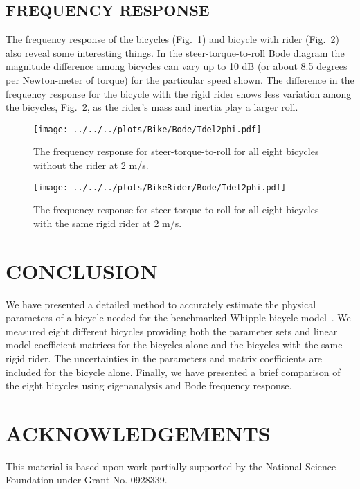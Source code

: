 \documentclass{bmd2010p}
\begin{document}
\subsection{FREQUENCY RESPONSE}
The frequency response of the bicycles (Fig.~\ref{fig:bikeBode}) and bicycle
with rider (Fig.~\ref{fig:bikeRiderBode}) also reveal some
interesting things. In the steer-torque-to-roll Bode diagram the magnitude
difference among bicycles can vary up to 10 dB (or about 8.5 degrees per Newton-meter of
torque) for the particular speed shown. The difference in the frequency response for the bicycle with the
rigid rider shows less variation among the bicycles,
Fig.~\ref{fig:bikeRiderBode}, as the rider's mass and inertia play a larger roll.
\begin{figure}[tbp]
    \centering
    \texttt{[image: ../../../plots/Bike/Bode/Tdel2phi.pdf]}
    \caption{The frequency response for steer-torque-to-roll for all eight
    bicycles without the rider at 2 m/s.}
    \label{fig:bikeBode}
\end{figure}
\begin{figure}[tbp]
    \centering
    \texttt{[image: ../../../plots/BikeRider/Bode/Tdel2phi.pdf]}
    \caption{The frequency response for steer-torque-to-roll for all eight
    bicycles with the same rigid rider at 2 m/s.}
    \label{fig:bikeRiderBode}
\end{figure}
\section{CONCLUSION}
We have presented a detailed method to accurately estimate the physical parameters
of a bicycle needed for the benchmarked Whipple bicycle
model~\cite{Meijaard2007}. We measured eight different bicycles providing
both the parameter sets and linear model coefficient matrices
for the bicycles alone and the bicycles with the same
rigid rider. The uncertainties in the parameters and matrix coefficients are
included for the bicycle alone. Finally, we have presented a brief comparison of the
eight bicycles using eigenanalysis and Bode frequency response.
\section{ACKNOWLEDGEMENTS}
This material is based upon work partially supported by the National Science
Foundation under Grant No. 0928339.



\appendix
\end{document}
